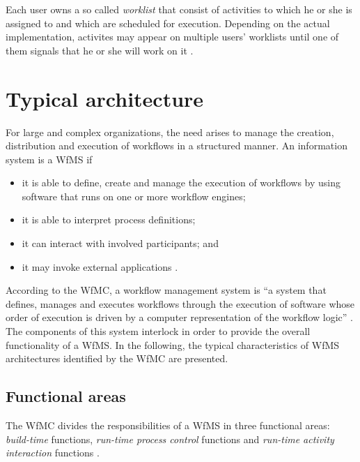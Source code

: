     Each user owns a so called \emph{worklist} that consist of activities to which he or she is assigned to and which are scheduled for execution. Depending on the actual implementation, activites may appear on multiple users' worklists until one of them signals that he or she will work on it \cite{Hollingsworth1995Wfmc,Casati1999Specification}.


\section{Typical architecture} %
\label{sec:typical_architecture}
  For large and complex organizations, the need arises to manage the creation, distribution and execution of workflows in a structured manner. An information system is a \ac{WfMS} if
  \begin{itemize}[nosep]
    \item it is able to define, create and manage the execution of workflows by using software that runs on one or more workflow engines;
    \item it is able to interpret process definitions;
    \item it can interact with involved participants; and
    \item it may invoke external applications \cite{Lawrence1997Workflow}.
  \end{itemize}

  According to the \ac{WfMC}, a workflow management system is ``a system that defines, manages and executes workflows through the execution of software whose order of execution is driven by a computer representation of the workflow logic'' \cite{Hollingsworth1995Wfmc}. The components of this system interlock in order to provide the overall functionality of a \ac{WfMS}. In the following, the typical characteristics of \ac{WfMS} architectures identified by the \ac{WfMC} are presented.

  \subsection{Functional areas} %
  \label{sub:functional_areas}
    The \ac{WfMC} divides the responsibilities of a \ac{WfMS} in three functional areas: \emph{build-time} functions, \emph{run-time process control} functions and \emph{run-time activity interaction} functions \cite{Hollingsworth1995Wfmc, Alonso1997Functionality}.

